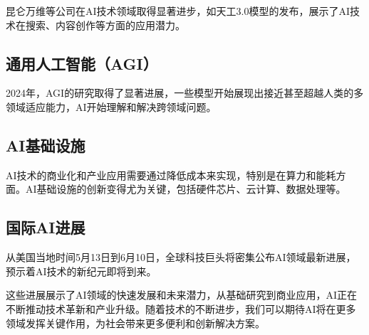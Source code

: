 昆仑万维等公司在AI技术领域\cite{RN2}取得显著进步\cite{RN3}，如天工3.0模型\cite{RN4}的发布，展示了AI技术在搜索\cite{RN5}、内容创作\cite{RN6}等方面的应用潜力。

\subsection{通用人工智能（AGI）\cite{RN7}}

2024年，AGI\cite{RN8}的研究取得了显著进展，一些模型\cite{RN9}开始展现出接近甚至超越人类的多领域适应能力\cite{RN10}，AI开始理解和解决跨领域问题\cite{RN11}。

\subsection{AI基础设施\cite{RN12}}

AI技术的商业化和产业应用需要通过降低成本来实现\cite{RN13}，特别是在算力和能耗方面。AI基础设施的创新变得尤为关键，包括硬件芯片\cite{RN14}、云计算、数据处理等。

\subsection{国际AI进展\cite{RN15} }

从美国当地时间5月13日到6月10日，全球科技巨头\cite{RN16}将密集公布AI领域最新进展，预示着AI技术的新纪元即将到来\cite{RN17}。

这些进展展示了AI领域的快速发展和未来潜力\cite{RN18}，从基础研究到商业应用，AI正在不断推动技术革新和产业升级\cite{RN19}。随着技术的不断进步\cite{RN20}，我们可以期待AI将在更多领域发挥关键作用\cite{RN21}，为社会带来更多便利和创新解决方案\cite{RN22}。